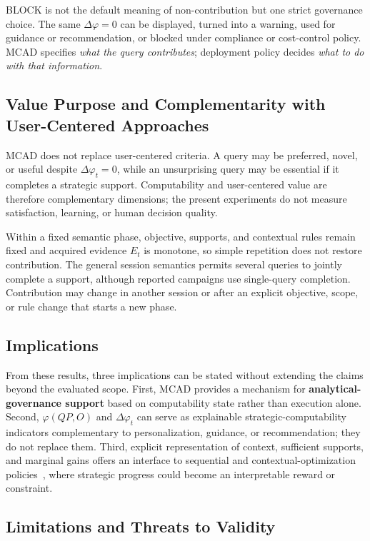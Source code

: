 \documentclass[journal]{IEEEtran}
\begin{document}
BLOCK is not the default meaning of non-contribution but one strict governance choice. The same $\Delta\varphi=0$ can be displayed, turned into a warning, used for guidance or recommendation, or blocked under compliance or cost-control policy. MCAD specifies \emph{what the query contributes}; deployment policy decides \emph{what to do with that information}.

\subsection{Value Purpose and Complementarity with User-Centered Approaches}

MCAD does not replace user-centered criteria. A query may be preferred, novel, or useful despite $\Delta\varphi_t=0$, while an unsurprising query may be essential if it completes a strategic support. Computability and user-centered value are therefore complementary dimensions; the present experiments do not measure satisfaction, learning, or human decision quality.

Within a fixed semantic phase, objective, supports, and contextual rules remain fixed and acquired evidence $E_t$ is monotone, so simple repetition does not restore contribution. The general session semantics permits several queries to jointly complete a support, although reported campaigns use single-query completion. Contribution may change in another session or after an explicit objective, scope, or rule change that starts a new phase.

\subsection{Implications}

From these results, three implications can be stated without extending the claims beyond the evaluated scope. First, MCAD provides a mechanism for \textbf{analytical-governance support} based on computability state rather than execution alone. Second, $\varphi(QP,O)$ and $\Delta\varphi_t$ can serve as explainable strategic-computability indicators complementary to personalization, guidance, or recommendation; they do not replace them. Third, explicit representation of context, sufficient supports, and marginal gains offers an interface to sequential and contextual-optimization policies~\cite{SadanaEJOR2025}, where strategic progress could become an interpretable reward or constraint.

\subsection{Limitations and Threats to Validity}
\end{document}
